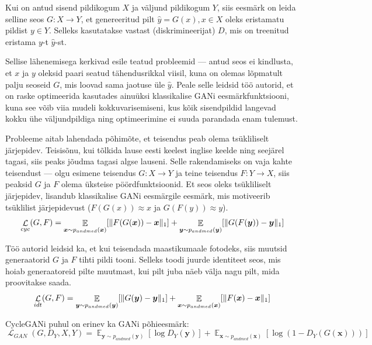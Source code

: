\documentclass{vilgym}
\DeclareMathOperator{\EX}{\mathbb{E}}
\DeclareMathOperator{\loss}{\mathcal{L}}
\DeclarePairedDelimiter{\norm}{\lVert}{\rVert}
\begin{document}
	Kui on antud sisend pildikogum $ X $ ja väljund pildikogum $ Y $, siis eesmärk on leida selline seos $ G: X \rightarrow Y $, et genereeritud pilt $ \hat{y} = G(x), x \in X $ oleks eristamatu pildist $ y \in Y $. Selleks kasutatakse vastast (diskrimineerijat) $ D $, mis on treenitud eristama $ y $-t $ \hat{y} $-st. 

	Sellise lähenemisega kerkivad esile teatud probleemid --- antud seos ei kindlusta, et $ x $ ja $ y $ oleksid paari seatud tähendusrikkal viisil, kuna on olemas lõpmatult palju seoseid $ G $, mis loovad sama jaotuse üle $ \hat{y} $. Peale selle leidsid töö autorid, et on raske optimeerida kasutades ainuüksi klassikalise GANi eesmärkfunktsiooni, kuna see võib viia mudeli kokkuvarisemiseni, kus kõik sisendpildid langevad kokku ühe väljundpildiga ning optimeerimine ei suuda parandada enam tulemust.

	Probleeme aitab lahendada põhimõte, et teisendus peab olema tsükliliselt järjepidev. Teisisõnu, kui tõlkida lause eesti keelest inglise keelde ning seejärel tagasi, siis peaks jõudma tagasi algse lauseni. Selle rakendamiseks on vaja kahte teisendust --- olgu esimene teisendus $ G\colon X \rightarrow Y $ ja teine teisendus $ F\colon Y \rightarrow X $, siis peaksid $ G $ ja $ F $ olema üksteise pöördfunktsioonid. Et seos oleks tsükliliselt järjepidev, lisandub klassikalise GANi eesmärgile eesmärk, mis motiveerib tsüklilist järjepidevust ($ F(G(x)) \approx x $ ja $ G(F(y)) \approx y $).
	\begin{equation}
		\loss_{cyc}(G,F) = \EX_{\boldsymbol{x}\sim p_{andmed}(\boldsymbol{x})}[\norm{F(G(\boldsymbol{x})) - \boldsymbol{x}}_1] + \EX_{\boldsymbol{y}\sim p_{andmed}(\boldsymbol{y})}[\norm{G(F(\boldsymbol{y})) - \boldsymbol{y}}_1]
	\end{equation}

	Töö autorid leidsid ka, et kui teisendada maastikumaale fotodeks, siis muutsid generaatorid $ G $ ja $ F $ tihti pildi tooni. Selleks toodi	juurde identiteet seos, mis hoiab generaatoreid pilte muutmast, kui pilt juba näeb välja nagu pilt, mida proovitakse saada.
	\begin{equation}
		\loss_{idt}(G,F) = \EX_{\boldsymbol{y}\sim p_{andmed}(\boldsymbol{y})}[\norm{G(\boldsymbol{y}) - \boldsymbol{y}}_1] + \EX_{\boldsymbol{x}\sim p_{andmed}(\boldsymbol{x})}[\norm{F(\boldsymbol{x}) - \boldsymbol{x}}_1]
	\end{equation}

	CycleGANi puhul on erinev ka GANi põhieesmärk:
	\begin{equation}
		\loss_{GAN}(G,D_Y, X, Y) = \EX_{\boldsymbol{y}\sim p_{andmed}(\boldsymbol{y})}[\log D_Y(\boldsymbol{y})] + \EX_{\boldsymbol{x}\sim p_{andmed}(\boldsymbol{x})}[\log(1-D_Y(G(\boldsymbol{x})))]
	\end{equation}
	
\end{document}
